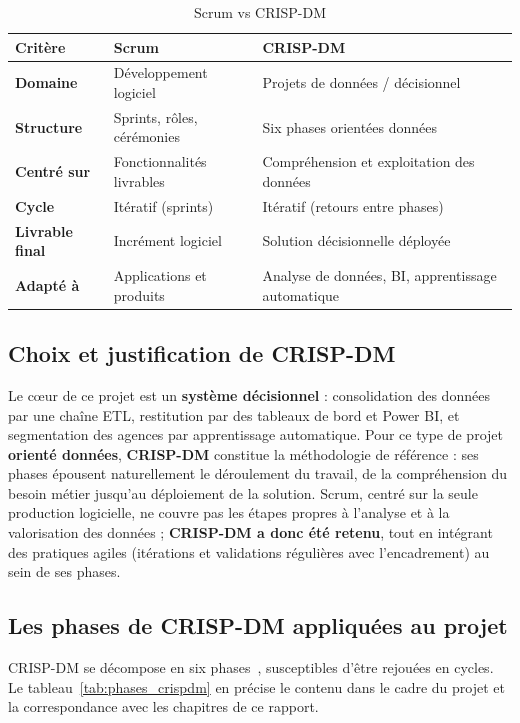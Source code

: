 \begin{table}[htbp]
\centering
\caption{Scrum vs CRISP-DM}
\label{tab:scrum_crispdm}
\renewcommand{\arraystretch}{1.2}
\begin{tabularx}{\textwidth}{|>{\bfseries}p{2.8cm}|X|X|}
\hline
\textmd{\textbf{Critère}} & \textbf{Scrum} & \textbf{CRISP-DM}\\
\hline
Domaine & Développement logiciel & Projets de données / décisionnel\\
\hline
Structure & Sprints, rôles, cérémonies & Six phases orientées données\\
\hline
Centré sur & Fonctionnalités livrables & Compréhension et exploitation des données\\
\hline
Cycle & Itératif (sprints) & Itératif (retours entre phases)\\
\hline
Livrable final & Incrément logiciel & Solution décisionnelle déployée\\
\hline
Adapté à & Applications et produits & Analyse de données, BI, apprentissage automatique\\
\hline
\end{tabularx}
\end{table}

\subsection{Choix et justification de CRISP-DM}
Le cœur de ce projet est un \textbf{système décisionnel} : consolidation des données
par une chaîne ETL, restitution par des tableaux de bord et Power BI, et
segmentation des agences par apprentissage automatique. Pour ce type de projet
\textbf{orienté données}, \textbf{CRISP-DM} constitue la méthodologie de référence :
ses phases épousent naturellement le déroulement du travail, de la compréhension du
besoin métier jusqu'au déploiement de la solution. Scrum, centré sur la seule
production logicielle, ne couvre pas les étapes propres à l'analyse et à la
valorisation des données ; \textbf{CRISP-DM a donc été retenu}, tout en intégrant des
pratiques agiles (itérations et validations régulières avec l'encadrement) au sein
de ses phases.

\subsection{Les phases de CRISP-DM appliquées au projet}
CRISP-DM se décompose en six phases~\cite{chapman2000crispdm}, susceptibles d'être
rejouées en cycles. Le
tableau~\ref{tab:phases_crispdm} en précise le contenu dans le cadre du projet et la
correspondance avec les chapitres de ce rapport.

